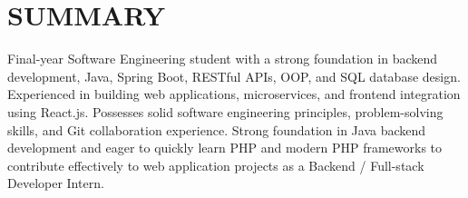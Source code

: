 \section{SUMMARY}
\noindent Final-year Software Engineering student with a strong foundation in backend development, Java, Spring Boot, RESTful APIs, OOP, and SQL database design. Experienced in building web applications, microservices, and frontend integration using React.js. Possesses solid software engineering principles, problem-solving skills, and Git collaboration experience. Strong foundation in Java backend development and eager to quickly learn PHP and modern PHP frameworks to contribute effectively to web application projects as a Backend / Full-stack Developer Intern.
